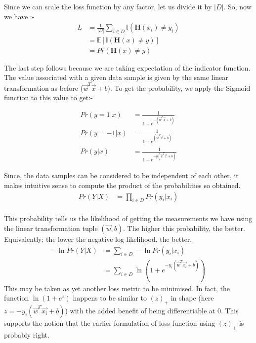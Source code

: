 \documentclass[12pt]{article}
\begin{document}
Since we can scale the loss function by any factor, let us divide it by $|D|$. So, now we have :-
\begin{align*}
    L &= \frac{1}{|D|}\sum_{i \in D} \mathbb{I}(\mathbf{H}(x_i)\neq y_i)\\
    &= \mathbb{E}\left[\mathbb{I}(\mathbf{H}(x)\neq y)\right]\\
    &= Pr(\mathbf{H}(x)\neq y)
\end{align*}

The last step follows because we are taking expectation of the indicator function.\\

The value associated with a given data sample is given by the same linear transformation as before ($\vec{w}^{T}\vec{x}+b$). To get the probability, we apply the Sigmoid function to this value to get:-

\begin{align*}
    Pr(y=1|x) &= \frac{1}{1+e^{-(\vec{w}^{T}\vec{x}+b)}}\\
    Pr(y=-1|x) &= \frac{1}{1+e^{(\vec{w}^{T}\vec{x}+b)}}\\
    Pr(y|x) &= \frac{1}{1+e^{-y(\vec{w}^{T}\vec{x}+b)}}
\end{align*}

Since, the data samples can be considered to be independent of each other, it makes intuitive sense to compute the product of the probabilities so obtained.\\

\begin{align*}
    Pr(Y|X) &= \prod_{i \in D}Pr(y_i|x_i)\\
\end{align*}

This probability tells us the likelihood of getting the measurements we have using the linear transformation tuple $(\vec{w},b)$. The higher this probability, the better. Equivalently; the lower the negative log likelihood, the better.
\begin{align}
    -\ln Pr(Y|X) &= \sum_{i \in D}-\ln Pr(y_i|x_i) \\
    &= \sum_{i \in D}\ln \left(1+e^{-y_i(\vec{w}^{T}\vec{x_i}+b)}\right)
\end{align}
This may be taken as yet another loss metric to be minimised. In fact, the function $\ln (1+e^z)$ happens to be similar to $(z)_+$ in shape (here $z = -y_i(\vec{w}^{T}\vec{x_i}+b)$) with the added benefit of being differentiable at $0$. This supports the notion that the earlier formulation of loss function using $(z)_+$ is probably right.
\end{document}
